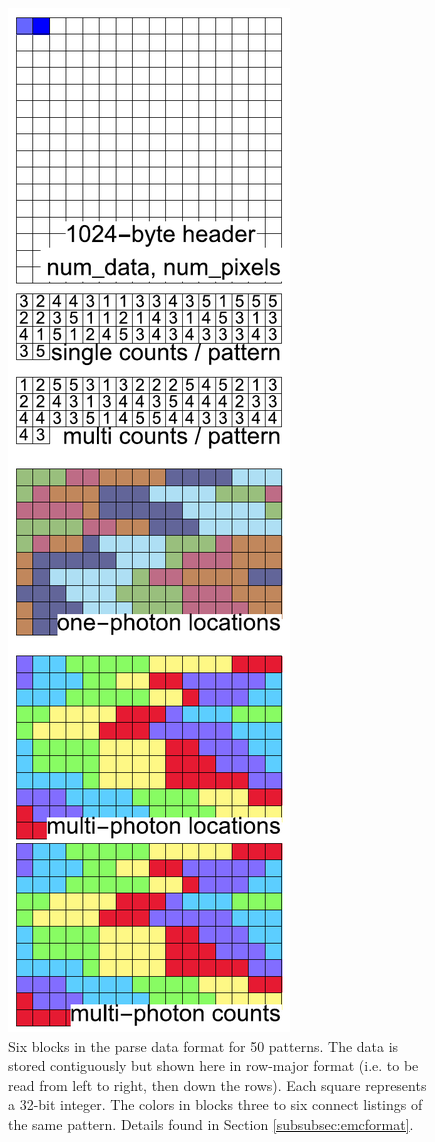 \documentclass[]{iucr}              %
\begin{document}
\begin{figure}
\caption{Six blocks in the parse data format for 50 patterns. The data is stored contiguously but shown here in row-major format (i.e. to be read from left to right, then down the rows). Each square represents a 32-bit integer. The colors in blocks three to six connect listings of the same pattern. Details found in Section \ref{subsubsec:emcformat}.}\label{fig:dataFormat}
\includegraphics[height=0.8\textheight]{figures/dataFormat}
\end{figure}
\end{document}
